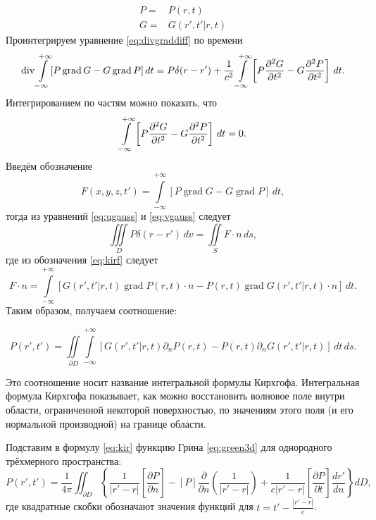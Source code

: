 \documentclass[a4paper, fontsize=14pt]{article}
\newcommand{\divop}{\operatorname{div}}
\newcommand{\gradop}{\operatorname{grad}}
\begin{document}
	\begin{align*}
		P =& P(r,t) \\
		G =& G(r',t'|r,t)
	\end{align*}
	Проинтегрируем уравнение \eqref{eq:divgraddiff} по времени
	\begin{equation}
		\divop \int\limits_{-\infty}^{+\infty} [P \gradop G - G \gradop P ]\, dt=  P\delta(r-r') +\frac{1}{c^2}\int\limits_{-\infty}^{+\infty}\left[P\diff[2]{G}{t} - G \diff[2]{P}{t}\right]\,dt.
		\label{eq:ugauss}
	\end{equation}
	Интегрированием по частям можно показать, что 
	$$
	\int\limits_{-\infty}^{+\infty}\left[P\diff[2]{G}{t} - G \diff[2]{P}{t}\right]\,dt = 0.
	$$
	Введём обозначение 
	\begin{equation}
			F(x,y,z,t') = \int\limits_{-\infty}^{+\infty} [P \gradop G - G \gradop P ]\, dt,
		\label{eq:kirf}
	\end{equation}
	тогда из уравнений \eqref{eq:ugauss} и \eqref{eq:vgauss} следует
	\begin{equation}
		\iiint\limits_D P\delta(r-r') \, dv = \iint\limits_S F \cdot n \, ds,
	\end{equation}
	где из обозначения \eqref{eq:kirf} следует
	\begin{equation}
		F\cdot n =  \int\limits_{-\infty}^{+\infty} 
		[G(r',t'|r,t)\gradop P(r,t) \cdot n
		- P(r,t)\gradop G(r',t'|r,t) \cdot n] \,dt.
	\end{equation}
Таким образом, получаем соотношение:
	
	\begin{equation}
		P(r',t') = \iint\limits_{\partial D} \int\limits_{-\infty}^{+\infty} 
	[G(r',t'|r,t)\partial_n P(r,t) 
	- P(r,t)\partial_n G(r',t'|r,t)] \,dt\,ds.
	\label{eq:kir}
	\end{equation}
	
	
	Это соотношение носит название интегральной формулы Кирхгофа.
	Интегральная
	формула Кирхгофа показывает, как можно восстановить волновое поле внутри области,
	ограниченной некоторой поверхностью, по значениям этого поля (и его нормальной
	производной) на границе области.
	
	Подставим в формулу \eqref{eq:kir} функцию Грина \eqref{eq:green3d} для однородного трёхмерного пространства:
	\begin{equation}
		P\left(r',t'\right)=\frac{1}{4\pi}\iint_{\partial D}^{}\left\{\frac{1}{|r'-r|}\left[\frac{\partial P}{\partial n}\right]-\left[P\right]\frac{\partial}{\partial n}\left(\frac{1}{|r'-r|}\right)+\frac{1}{c |r'-r|}\left[\frac{\partial P}{\partial t}\right]\frac{d r'}{d n}\right\}d D,
		\label{eq:kirg0}
	\end{equation}
		где квадратные скобки обозначают значения функций для $t=t'-\frac{|r'-r|}{c}$.
	
\end{document}

